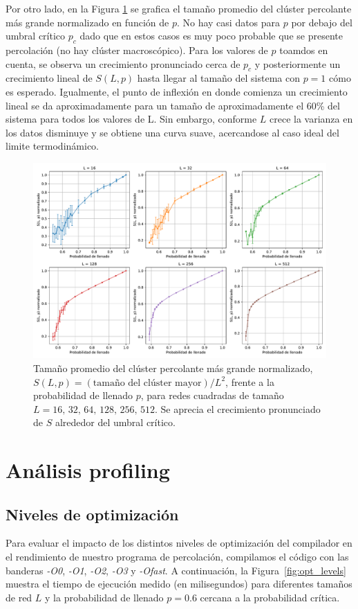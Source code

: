 \documentclass{article}
\begin{document}
Por otro lado, en la Figura \ref{fig:size} se grafica el tamaño promedio del clúster percolante más grande normalizado en función de \(p\). No hay casi datos para \(p\) por debajo del umbral crítico \(p_c\) dado que en estos casos es muy poco probable que se presente percolación (no hay clúster macroscópico). Para los valores de \(p\) toamdos en cuenta, se observa un crecimiento pronunciado cerca de \(p_c\) y posteriormente un crecimiento lineal de \(S(L,p)\) hasta llegar al tamaño del sistema con \(p = 1\) cómo es esperado. Igualmente, el punto de inflexión en donde comienza un crecimiento lineal se da aproximadamente para un tamaño de aproximadamente el 60\% del sistema para todos los valores de L. Sin embargo, conforme \(L\) crece la varianza en los datos disminuye y se obtiene una curva suave, acercandose al caso ideal del limite termodinámico.

\begin{figure}[h]
    \centering
    \includegraphics[width=1.0\textwidth]{figures/Size.pdf}
    \caption{Tamaño promedio del clúster percolante más grande normalizado, \(S(L,p) = ( \text{tamaño del clúster mayor} ) / L^2\), frente a la probabilidad de llenado \(p\), para redes cuadradas de tamaño \(L = 16,\,32,\,64,\,128,\,256,\,512\). Se aprecia el crecimiento pronunciado de \(S\) alrededor del umbral crítico.}
    \label{fig:size}
\end{figure}

\section{Análisis profiling}

\subsection{Niveles de optimización}
Para evaluar el impacto de los distintos niveles de optimización del compilador en el rendimiento de nuestro programa de percolación, compilamos el código con las banderas \textit{-O0}, \textit{-O1}, \textit{-O2}, \textit{-O3} y \textit{-Ofast}. A continuación, la Figura~\ref{fig:opt_levels} muestra el tiempo de ejecución medido (en milisegundos) para diferentes tamaños de red \(L\) y la probabilidad de llenado \(p = 0.6\) cercana a la probabilidad crítica.
\end{document}
